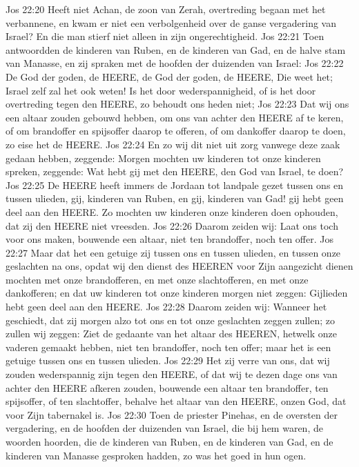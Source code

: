Jos 22:20  Heeft niet Achan, de zoon van Zerah, overtreding begaan met het verbannene, en kwam er niet een verbolgenheid over de ganse vergadering van Israel? En die man stierf niet alleen in zijn ongerechtigheid.
Jos 22:21  Toen antwoordden de kinderen van Ruben, en de kinderen van Gad, en de halve stam van Manasse, en zij spraken met de hoofden der duizenden van Israel:
Jos 22:22  De God der goden, de HEERE, de God der goden, de HEERE, Die weet het; Israel zelf zal het ook weten! Is het door wederspannigheid, of is het door overtreding tegen den HEERE, zo behoudt ons heden niet;
Jos 22:23  Dat wij ons een altaar zouden gebouwd hebben, om ons van achter den HEERE af te keren, of om brandoffer en spijsoffer daarop te offeren, of om dankoffer daarop te doen, zo eise het de HEERE.
Jos 22:24  En zo wij dit niet uit zorg vanwege deze zaak gedaan hebben, zeggende: Morgen mochten uw kinderen tot onze kinderen spreken, zeggende: Wat hebt gij met den HEERE, den God van Israel, te doen?
Jos 22:25  De HEERE heeft immers de Jordaan tot landpale gezet tussen ons en tussen ulieden, gij, kinderen van Ruben, en gij, kinderen van Gad! gij hebt geen deel aan den HEERE. Zo mochten uw kinderen onze kinderen doen ophouden, dat zij den HEERE niet vreesden.
Jos 22:26  Daarom zeiden wij: Laat ons toch voor ons maken, bouwende een altaar, niet ten brandoffer, noch ten offer.
Jos 22:27  Maar dat het een getuige zij tussen ons en tussen ulieden, en tussen onze geslachten na ons, opdat wij den dienst des HEEREN voor Zijn aangezicht dienen mochten met onze brandofferen, en met onze slachtofferen, en met onze dankofferen; en dat uw kinderen tot onze kinderen morgen niet zeggen: Gijlieden hebt geen deel aan den HEERE.
Jos 22:28  Daarom zeiden wij: Wanneer het geschiedt, dat zij morgen alzo tot ons en tot onze geslachten zeggen zullen; zo zullen wij zeggen: Ziet de gedaante van het altaar des HEEREN, hetwelk onze vaderen gemaakt hebben, niet ten brandoffer, noch ten offer; maar het is een getuige tussen ons en tussen ulieden.
Jos 22:29  Het zij verre van ons, dat wij zouden wederspannig zijn tegen den HEERE, of dat wij te dezen dage ons van achter den HEERE afkeren zouden, bouwende een altaar ten brandoffer, ten spijsoffer, of ten slachtoffer, behalve het altaar van den HEERE, onzen God, dat voor Zijn tabernakel is.
Jos 22:30  Toen de priester Pinehas, en de oversten der vergadering, en de hoofden der duizenden van Israel, die bij hem waren, de woorden hoorden, die de kinderen van Ruben, en de kinderen van Gad, en de kinderen van Manasse gesproken hadden, zo was het goed in hun ogen.
